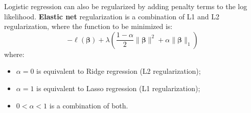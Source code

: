 Logistic regression can also be regularized by adding penalty terms to the log likelihood. \textbf{Elastic net} regularization is a combination of L1 and L2 regularization, where the function to be minimized is:
\begin{equation*}
    - \ell(\boldsymbol{\beta}) + \lambda \left( \frac{1-\alpha}{2} \|\boldsymbol{\beta}\|^2 + \alpha \|\boldsymbol{\beta}\|_1\right)
\end{equation*}
where:
\begin{itemize}[noitemsep]
    \item $\alpha = 0$ is equivalent to Ridge regression (L2 regularization);
    \item $\alpha = 1$ is equivalent to Lasso regression (L1 regularization);
    \item $0 < \alpha < 1$ is a combination of both.
\end{itemize}